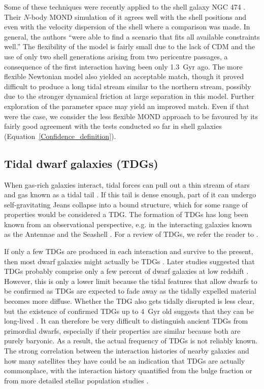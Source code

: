 \documentclass[fleqn,usenatbib,useAMS,onecolumn]{mnras} %
\begin{document}
Some of these techniques were recently applied to the shell galaxy NGC 474 \citep{Bilek_2022}. Their $N$-body MOND simulation of it agrees well with the shell positions and even with the velocity dispersion of the shell where a comparison was made. In general, the authors ``were able to find a scenario that fits all
available constraints well.'' The flexibility of the model is fairly small due to the lack of CDM and the use of only two shell generations arising from two pericentre passages, a consequence of the first interaction having been only 1.3~Gyr ago. The more flexible Newtonian model also yielded an acceptable match, though it proved difficult to produce a long tidal stream similar to the northern stream, possibly due to the stronger dynamical friction at large separation in this model. Further exploration of the parameter space may yield an improved match. Even if that were the case, we consider the less flexible MOND approach to be favoured by its fairly good agreement with the tests conducted so far in shell galaxies (Equation~\ref{Confidence_definition}).



\subsection{Tidal dwarf galaxies (TDGs)}
\label{Tidal_dwarf_galaxies}

When gas-rich galaxies interact, tidal forces can pull out a thin stream of stars and gas known as a tidal tail \citep{Toomre_1972}. If this tail is dense enough, part of it can undergo self-gravitating Jeans collapse into a bound structure, which for some range of properties would be considered a TDG. The formation of TDGs has long been known from an observational perspective, e.g. in the interacting galaxies known as the Antennae \citep{Mirabel_1992} and the Seashell \citep{Bournaud_2004}. For a review of TDGs, we refer the reader to \citet{Lelli_2015}.

If only a few TDGs are produced in each interaction and survive to the present, then most dwarf galaxies might actually be TDGs \citep{Okazaki_2000}. Later studies suggested that TDGs probably comprise only a few percent of dwarf galaxies at low redshift \citep{Kaviraj_2012}. However, this is only a lower limit because the tidal features that allow dwarfs to be confirmed as TDGs are expected to fade away as the tidally expelled material becomes more diffuse. Whether the TDG also gets tidally disrupted is less clear, but the existence of confirmed TDGs up to 4~Gyr old suggests that they can be long-lived \citep{Duc_2014}. It can therefore be very difficult to distinguish ancient TDGs from primordial dwarfs, especially if their properties are similar because both are purely baryonic. As a result, the actual frequency of TDGs is not reliably known. The strong correlation between the interaction histories of nearby galaxies and how many satellites they have could be an indication that TDGs are actually commonplace, with the interaction history quantified from the bulge fraction \citep{Kroupa_2010, Corredoira_2016, Javanmardi_2019} or from more detailed stellar population studies \citep{Smercina_2022}.
\end{document}
